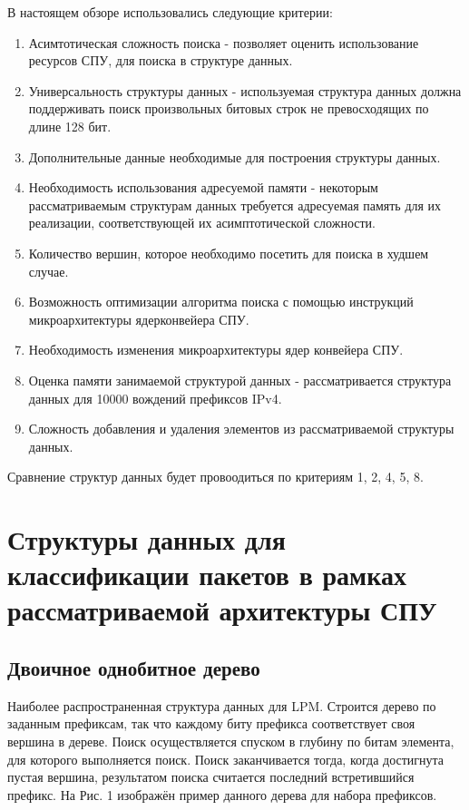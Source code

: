 \documentclass[a4peper, 12pt, titlepage, finall]{report}
\begin{document}
        В настоящем обзоре использовались следующие критерии:
        \begin{enumerate}
            \item Асимтотическая сложность поиска - позволяет оценить использование ресурсов СПУ, для поиска в структуре данных.
            \item Универсальность структуры данных - используемая структура данных должна поддерживать поиск произвольных битовых строк
                  не превосходящих по длине 128 бит.
            \item Дополнительные данные необходимые для построения структуры данных.
            \item Необходимость использования адресуемой памяти - некоторым рассматриваемым структурам данных требуется адресуемая память для их реализации, соответствующей их асимптотической сложности.
            \item Количество вершин, которое необходимо посетить для поиска в худшем случае.
            \item Возможность оптимизации алгоритма поиска с помощью инструкций микроархитектуры ядерконвейера СПУ.
            \item Необходимость изменения микроархитектуры ядер конвейера СПУ.
            \item Оценка памяти занимаемой структурой данных - рассматривается структура данных для 10000 вождений префиксов IPv4.
            \item Сложность добавления и удаления элементов из рассматриваемой структуры данных.
        \end{enumerate}

        Сравнение структур данных будет провоодиться по критериям 1, 2, 4, 5, 8.

    \section{Структуры данных для классификации пакетов в рамках рассматриваемой архитектуры СПУ}
        \subsection{Двоичное однобитное дерево}
            Наиболее распространенная структура данных для LPM. Строится дерево по заданным префиксам, 
            так что каждому биту префикса соответствует своя вершина в дереве. 
            Поиск осуществляется спуском в глубину по битам элемента, для которого выполняется поиск. 
            Поиск заканчивается тогда, когда достигнута пустая вершина, результатом поиска считается последний встретившийся префикс. 
            На Рис. 1 изображён пример данного дерева для набора префиксов.
\end{document}
